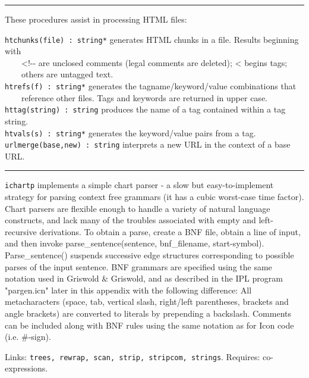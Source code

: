 \vspace{0.25cm}\hrule{}

These procedures assist in processing HTML files:

\texttt{htchunks(file) : string*} generates HTML chunks in a
file. Results beginning with\\
 \ \ \ \ {\textless}!-{}- are unclosed comments
(legal comments are deleted); {\textless} begins tags;\\
 \ \ \ \ others are untagged text.\\
\texttt{htrefs(f) : string*} generates the tagname/keyword/value
combinations that\\
 \ \ \ \ reference other files. Tags and
keywords are returned in upper case.\\
\texttt{httag(string) : string} produces the name of a tag contained
within a tag string.\\
\texttt{htvals(s) : string*} generates the keyword/value pairs from a
tag.\\
\texttt{urlmerge(base,new) : string} interprets a new URL in the context
of a base URL.

\vspace{0.25cm}\hrule{}

\texttt{ichartp} implements a simple chart
parser - a slow but easy-to-implement strategy for parsing
context free grammars (it has a cubic worst-case time factor). Chart
parsers are flexible enough to handle a variety of natural language
constructs, and lack many of the troubles associated with empty and
left-recursive derivations. To obtain a parse, create a BNF
file, obtain a line of input, and then invoke parse\_sentence(sentence,
bnf\_filename, start-symbol). Parse\_sentence() suspends successive
edge structures corresponding to possible parses of the input sentence.
BNF grammars are specified using the same notation used in Griswold \&
Griswold, and as described in the IPL program
"pargen.icn" later in this appendix with
the following difference: All metacharacters (space, tab, vertical
slash, right/left parentheses, brackets and angle brackets) are
converted to literals by prepending a backslash. Comments can be
included along with BNF rules using the same notation as for Icon code
(i.e. \#-sign).

Links: \texttt{trees, rewrap, scan, strip, stripcom, strings}. Requires:
co-expressions.

